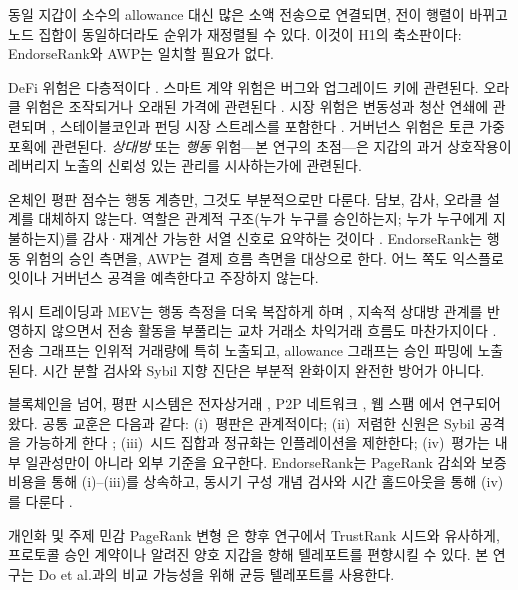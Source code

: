 동일 지갑이 소수의 allowance 대신 많은 소액 전송으로 연결되면, 전이 행렬이 바뀌고 노드 집합이 동일하더라도 순위가 재정렬될 수 있다. 이것이 H1의 축소판이다: EndorseRank와 AWP는 일치할 필요가 없다.


DeFi 위험은 다층적이다 . 스마트 계약 위험은 버그와 업그레이드 키에 관련된다. 오라클 위험은 조작되거나 오래된 가격에 관련된다 . 시장 위험은 변동성과 청산 연쇄에 관련되며 , 스테이블코인과 펀딩 시장 스트레스를 포함한다 . 거버넌스 위험은 토큰 가중 포획에 관련된다. \emph{상대방} 또는 \emph{행동} 위험---본 연구의 초점---은 지갑의 과거 상호작용이 레버리지 노출의 신뢰성 있는 관리를 시사하는가에 관련된다.

온체인 평판 점수는 행동 계층만, 그것도 부분적으로만 다룬다. 담보, 감사, 오라클 설계를 대체하지 않는다. 역할은 관계적 구조(누가 누구를 승인하는지; 누가 누구에게 지불하는지)를 감사·재계산 가능한 서열 신호로 요약하는 것이다 . EndorseRank는 행동 위험의 승인 측면을, AWP는 결제 흐름 측면을 대상으로 한다. 어느 쪽도 익스플로잇이나 거버넌스 공격을 예측한다고 주장하지 않는다.

워시 트레이딩과 MEV는 행동 측정을 더욱 복잡하게 하며 , 지속적 상대방 관계를 반영하지 않으면서 전송 활동을 부풀리는 교차 거래소 차익거래 흐름도 마찬가지이다 . 전송 그래프는 인위적 거래량에 특히 노출되고, allowance 그래프는 승인 파밍에 노출된다. 시간 분할 검사와 Sybil 지향 진단은 부분적 완화이지 완전한 방어가 아니다.


블록체인을 넘어, 평판 시스템은 전자상거래 , P2P 네트워크 , 웹 스팸 에서 연구되어 왔다. 공통 교훈은 다음과 같다: (i)~평판은 관계적이다; (ii)~저렴한 신원은 Sybil 공격을 가능하게 한다 ; (iii)~시드 집합과 정규화는 인플레이션을 제한한다; (iv)~평가는 내부 일관성만이 아니라 외부 기준을 요구한다. EndorseRank는 PageRank 감쇠와 보증 비용을 통해 (i)--(iii)를 상속하고, 동시기 구성 개념 검사와 시간 홀드아웃을 통해 (iv)를 다룬다 .

개인화 및 주제 민감 PageRank 변형 은 향후 연구에서 TrustRank 시드와 유사하게, 프로토콜 승인 계약이나 알려진 양호 지갑을 향해 텔레포트를 편향시킬 수 있다. 본 연구는 Do et al.과의 비교 가능성을 위해 균등 텔레포트를 사용한다.


